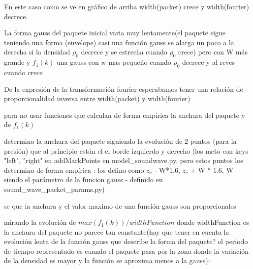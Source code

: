 \documentclass{article}
\begin{document}
\begin{description}
\item En este caso como se ve en gráfico de arriba width(packet) crece y width(fourier) decrece.
\item La forma gauss del paquete inicial varia muy lentamente(el paquete sigue teniendo una forma (envelope) casi una función gauss se alarga un poco a la derecha si 
la densidad $\rho_0$ decrece y se estrecha  cuando $\rho_0$ crece) 
pero con W más grande y $f_1(k)$ una gauss con w mas pequeño cuando $\rho_0$ decrece y al reves cuando crece
\item De la expresión de la transformación fourier 
esperabamos tener una relación de proporcionalidad inversa entre width(packet) y width(fourier)
\item para no usar funciones que calculan de forma empirica la anchura del paquete  y de  $f_1(k)$ 
\begin{description}
\item determino la anchura del paquete siguiendo la evolución de 2 puntos (para la presión) que al principio están el el borde izquierdo y derecho (los meto con keys "left", "right"  en addMarkPoints en model\_soundwave.py, pero estos puntos los determino de forma empírica : los defino como $z_c$ - W*1.6,  $z_c$ + W * 1.6, W siendo el parámetro de la funcion gauss - definido en sound\_wave\_packet\_params.py) 
\item se que la anchura y el valor maximo de una función gauss son proporcionales 
\item mirando la evolución de $max(f_1(k))/widthFunction$ donde widthFunction es la anchura del paquete
no parece tan constante(hay que tener en cuenta la evolución lenta de la función gauss  que describe la forma del paquete? el periodo de tiempo representado es cuando el paquete pasa por la zona donde la variación de la densidad es mayor y la función se aproxima menos a la gauss):

\end{description}




\end{description}
\end{document}
